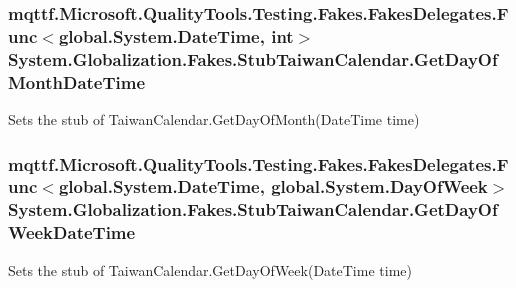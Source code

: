 \hypertarget{class_system_1_1_globalization_1_1_fakes_1_1_stub_taiwan_calendar_a3f1ffec633864af718c244634d536110}{
\subsubsection[{Get\-Day\-Of\-Month\-Date\-Time}]{\setlength{\rightskip}{0pt plus 5cm}mqttf.\-Microsoft.\-Quality\-Tools.\-Testing.\-Fakes.\-Fakes\-Delegates.\-Func$<$global.\-System.\-Date\-Time, int$>$ System.\-Globalization.\-Fakes.\-Stub\-Taiwan\-Calendar.\-Get\-Day\-Of\-Month\-Date\-Time}}\label{class_system_1_1_globalization_1_1_fakes_1_1_stub_taiwan_calendar_a3f1ffec633864af718c244634d536110}


Sets the stub of Taiwan\-Calendar.\-Get\-Day\-Of\-Month(\-Date\-Time time)

\hypertarget{class_system_1_1_globalization_1_1_fakes_1_1_stub_taiwan_calendar_a99b48f09363b75718c3359ba9bfa120e}{
\subsubsection[{Get\-Day\-Of\-Week\-Date\-Time}]{\setlength{\rightskip}{0pt plus 5cm}mqttf.\-Microsoft.\-Quality\-Tools.\-Testing.\-Fakes.\-Fakes\-Delegates.\-Func$<$global.\-System.\-Date\-Time, global.\-System.\-Day\-Of\-Week$>$ System.\-Globalization.\-Fakes.\-Stub\-Taiwan\-Calendar.\-Get\-Day\-Of\-Week\-Date\-Time}}\label{class_system_1_1_globalization_1_1_fakes_1_1_stub_taiwan_calendar_a99b48f09363b75718c3359ba9bfa120e}


Sets the stub of Taiwan\-Calendar.\-Get\-Day\-Of\-Week(\-Date\-Time time)

